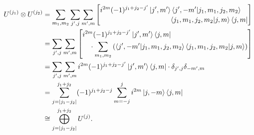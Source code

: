 \documentclass[preprint, 12pt]{revtex4-2}
\numberwithin{equation}{section}
\begin{document}
\begin{equation}
    \begin{aligned}
        U^{(j_1)}\otimes U^{(j_2)} 
        &= \sum_{m_1, m_2}\sum_{j', j}\sum_{m', m}
            \left[\begin{multlined}
                i^{2m}(-1)^{j_1+j_2-j'}\ket{j', m'}\bra{j', -m'}\ket{j_1, m_1, j_2, m_2}\\
                \bra{j_1, m_1, j_2, m_2}\ket{j, m}\bra{j, m}
            \end{multlined}\right] \\
        &= \sum_{j', j}\sum_{m', m}
            \left[\begin{multlined}
                i^{2m}(-1)^{j_1+j_2-j'}\ket{j', m'}\bra{j, m}\\
                \cdot\sum_{m_1, m_2}\left(\bra{j', -m'}\ket{j_1, m_1, j_2, m_2}
                \bra{j_1, m_1, j_2, m_2}\ket{j, m}\right)
            \end{multlined}\right] \\
        &= \sum_{j', j}\sum_{m', m}i^{2m}(-1)^{j_1+j_2-j'}\ket{j', m'}\bra{j, m}\cdot\delta_{j',j}\delta_{-m',m} \\
        &= \sum_{j=|j_1-j_2|}^{j_1+j_2}(-1)^{j_1+j_2-j}\sum_{m=-j}^{j}i^{2m}\ket{j, -m}\bra{j,m} \\
        &\cong \bigoplus_{j=|j_1-j_2|}^{j_1+j_2}U^{(j)}.
    \end{aligned}
\end{equation}
\end{document}
